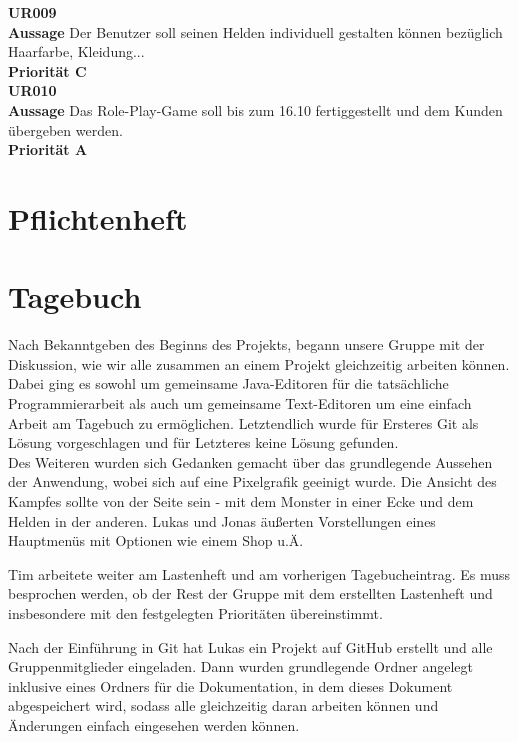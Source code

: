 \textbf{UR009}\\
\textbf{Aussage} Der Benutzer soll seinen Helden individuell gestalten können bezüglich Haarfarbe, Kleidung...\\
\textbf{Priorität C}\\

\textbf{UR010}\\
\textbf{Aussage} Das Role-Play-Game soll bis zum 16.10 fertiggestellt und dem Kunden übergeben werden.\\
\textbf{Priorität A}

\newpage

\section{Pflichtenheft}
\label{Pflichtenheft}

\newpage

\section{Tagebuch}
\label{Tagebuch}


Nach Bekanntgeben des Beginns des Projekts, begann unsere Gruppe mit der Diskussion, wie wir alle zusammen an einem Projekt gleichzeitig arbeiten können. Dabei ging es sowohl um gemeinsame Java-Editoren für die tatsächliche Programmierarbeit als auch um gemeinsame Text-Editoren um eine einfach Arbeit am Tagebuch zu ermöglichen. Letztendlich wurde für Ersteres Git als Lösung vorgeschlagen und für Letzteres keine Lösung gefunden.\\
Des Weiteren wurden sich Gedanken gemacht über das grundlegende Aussehen der Anwendung, wobei sich auf eine \glqq{}Pixelgrafik\grqq{} geeinigt wurde. Die Ansicht des Kampfes sollte von der Seite sein - mit dem Monster in einer Ecke und dem Helden in der anderen. Lukas und Jonas äußerten Vorstellungen eines Hauptmenüs mit Optionen wie einem Shop u.Ä.\\


Tim arbeitete weiter am Lastenheft und am vorherigen Tagebucheintrag. Es muss besprochen werden, ob der Rest der Gruppe mit dem erstellten Lastenheft und insbesondere mit den festgelegten Prioritäten übereinstimmt.\\


Nach der Einführung in Git hat Lukas ein Projekt auf GitHub erstellt und alle Gruppenmitglieder eingeladen. Dann wurden grundlegende Ordner angelegt inklusive eines Ordners für die Dokumentation, in dem dieses Dokument abgespeichert wird, sodass alle \glqq{}gleichzeitig\grqq{} daran arbeiten können und Änderungen einfach eingesehen werden können.


